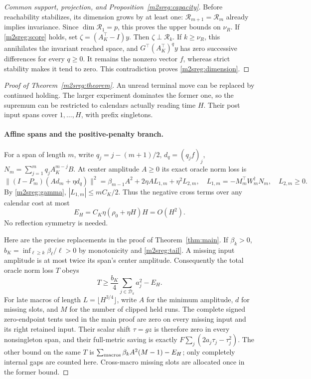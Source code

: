 \begin{proof}[Common support, projection, and Proposition~\ref{m2sreg:capacity}]
Before reachability stabilizes, its dimension grows by at least one:
$\mathcal R_{m+1}=\mathcal R_m$ already implies invariance.
Since $\dim\mathcal R_1=p$, this proves the upper bounds on $\nu_R$.
If \eqref{m2sreg:score} holds, set $\zeta=(A_K^\top-I)y$.
Then $\zeta\perp\mathcal R_k$.
If $k\ge\nu_R$, this annihilates the invariant reached space, and
$G^\top(A_K^\top)^q y$ has zero successive differences for every
$q\ge0$. It remains the nonzero vector $f$, whereas strict stability
makes it tend to zero. This contradiction proves
\eqref{m2sreg:dimension}.
\end{proof}

\begin{proof}[Proof of Theorem~\ref{m2sreg:theorem}]
An unread terminal move can be replaced by continued holding.
The larger experiment dominates the former one, so the supremum can
be restricted to calendars actually reading time $H$.
Their post input spans cover $1,\ldots,H$, with prefix singletons.

\paragraph{Affine spans and the positive-penalty branch.}
For a span of length $m$, write $q_j=j-(m+1)/2$,
$d_q=(q_jf)_j$, $N_m=\sum_{j=1}^m q_jA_K^{m-j}B$.
At center amplitude $A\ge0$ its exact oracle norm loss is
\begin{equation}\label{m2sreg:affine}
\|(I-P_m)(A d_m+\eta d_q)\|^2
=\beta_{m-1}A^2+2\eta A L_{1,m}+\eta^2L_{2,m},
\quad
L_{1,m}=-M_m^\top W_m^\dagger N_m,\quad L_{2,m}\ge0 .
\end{equation}
By \eqref{m2sreg:gamma}, $|L_{1,m}|\le mC_K/2$.
Thus the negative cross terms over any calendar cost at most
\begin{equation}\label{m2sreg:crossbudget}
E_H=C_K\eta(\rho_0+\eta H)H=O(H^2).
\end{equation}
No reflection symmetry is needed.

Here are the precise replacements in the proof of
Theorem~\ref{thm:main}. If $\beta_k>0$,
$b_K=\inf_{\ell\ge k}\beta_\ell/\ell>0$ by monotonicity and
\eqref{m2sreg:tail}. A missing input amplitude is at most twice
its span's center amplitude. Consequently the total oracle norm
loss $T$ obeys
\[
T\ge \frac{b_K}{4}\sum_{j\in\mathcal D_\pi}a_j^2-E_H .
\]
For late macros of length $L=\lfloor H^{3/4}\rfloor$, write
$A$ for the minimum amplitude, $d$ for missing slots, and $M$
for the number of clipped held runs.
The complete signed zero-endpoint tents used in the main proof are
zero on every missing input and its right retained input.
Their scalar shift $\tau=gz$ is therefore zero in every
nonsingleton span, and their full-metric saving is exactly
$F\sum_j(2a_j\tau_j-\tau_j^2)$.
The other bound on the same $T$ is
$\sum_{\rm macros}\beta_kA^2(M-1)-E_H$;
only completely internal gaps are counted here.
Cross-macro missing slots are allocated once in the former bound.


\end{proof}
